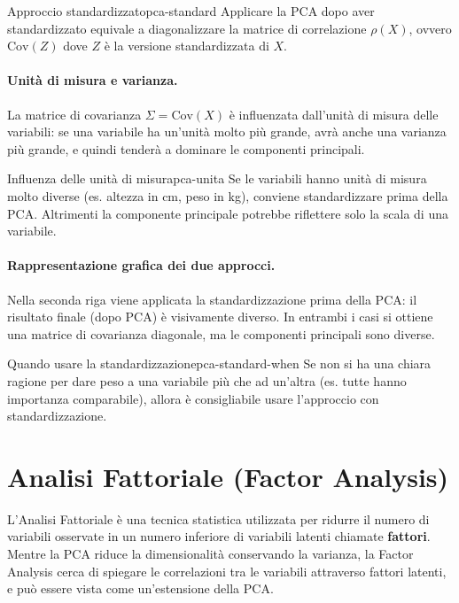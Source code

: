 \begin{nota}{Approccio standardizzato}{pca-standard}
Applicare la PCA dopo aver standardizzato equivale a diagonalizzare la matrice
di correlazione \( \rho(X) \), ovvero \( \mathrm{Cov}(Z) \) dove \( Z \) è la
versione standardizzata di \( X \).
\end{nota}

\paragraph{Unità di misura e varianza.}
La matrice di covarianza \( \Sigma = \mathrm{Cov}(X) \) è influenzata
dall’unità di misura delle variabili: se una variabile ha un’unità molto
più grande, avrà anche una varianza più grande, e quindi tenderà a dominare
le componenti principali.

\begin{nota}{Influenza delle unità di misura}{pca-unita}
Se le variabili hanno unità di misura molto diverse (es. altezza in cm, peso in
kg), conviene standardizzare prima della PCA. Altrimenti la componente
principale potrebbe riflettere solo la scala di una variabile.
\end{nota}

\paragraph{Rappresentazione grafica dei due approcci.}

Nella seconda riga viene applicata la standardizzazione prima della PCA: il
risultato finale (dopo PCA) è visivamente diverso. In entrambi i casi si
ottiene una matrice di covarianza diagonale, ma le componenti principali sono
diverse.

\begin{nota}{Quando usare la standardizzazione}{pca-standard-when}
Se non si ha una chiara ragione per dare peso a una variabile più che ad
un'altra (es. tutte hanno importanza comparabile), allora è consigliabile usare
l'approccio con standardizzazione.
\end{nota}



\section{Analisi Fattoriale (Factor Analysis)}\label{sec:factor-analysis}

L'Analisi Fattoriale è una tecnica statistica utilizzata per ridurre il numero
di variabili osservate in un numero inferiore di variabili latenti chiamate
\textbf{fattori}. Mentre la PCA riduce la dimensionalità conservando la
varianza, la Factor Analysis cerca di spiegare le correlazioni tra le variabili
attraverso fattori latenti, e può essere vista come un'estensione della PCA.

